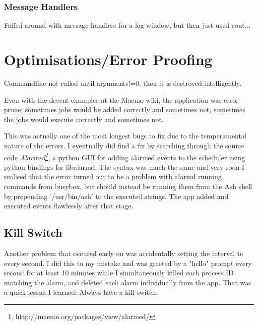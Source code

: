 \documentclass[11pt]{article} %
\begin{document}
\subsubsection{Message Handlers}
Faffed around with message handlers for a log window, but then just used cout...

\section{Optimisations/Error Proofing}
Commandline not called until arguments!=0, then it is destroyed intelligently.

Even with the decent examples at the Maemo wiki, the application was error prone: sometimes jobs would be added correctly and sometimes not, sometimes the jobs would execute correctly and sometimes not. 

This was actually one of the most longest bugs to fix due to the temperamental nature of the errors. I eventually did find a fix by searching through the source code {\it Alarmed\footnote{http://maemo.org/packages/view/alarmed/}}, a python GUI for adding alarmed events to the scheduler using python bindings for libalarmd. The syntax was much the same and very soon I realised that the error turned out to be a problem with alarmd running commands from busybox, but should instead be running them from the Ash shell by prepending '/usr/bin/ash' to the executed strings. The app added and executed events flawlessly after that stage.

\subsection{Kill Switch}


Another problem that occured early on was accidentally setting the interval to every second. I did this to my mistake and was greeted by a "hello" prompt every second for at least 10 minutes while I simultaneously killed each process ID matching the alarm, and deleted each alarm individually from the app. That was a quick lesson I learned: Always have a kill switch.
\end{document}
